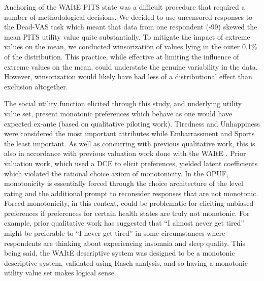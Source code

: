 \documentclass[
  number,
  preprint]{elsarticle}
\begin{document}
Anchoring of the WAItE PITS state was a difficult procedure that
required a number of methodological decisions. We decided to use
uncensored responses to the Dead-VAS task which meant that data from one
respondent (-99) skewed the mean PITS utility value quite substantially.
To mitigate the impact of extreme values on the mean, we conducted
winsorization of values lying in the outer 0.1\% of the distribution.
This practice, while effective at limiting the influence of extreme
values on the mean, could understate the genuine variability in the
data. However, winsorization would likely have had less of a
distributional effect than exclusion altogether.

The social utility function elicited through this study, and underlying
utility value set, present monotonic preferences which behave as one
would have expected ex-ante (based on qualitative piloting work).
Tiredness and Unhappiness were considered the most important attributes
while Embarrassment and Sports the least important. As well as
concurring with previous qualitative work, this is also in accordance
with previous valuation work done with the WAItE
\citep{Robinson2024AUKValue}. Prior valuation work, which used a DCE to
elicit preferences, yielded latent coefficients which violated the
rational choice axiom of monotonicity. In the OPUF, monotonicity is
essentially forced through the choice architecture of the level rating
and the additional prompt to reconsider responses that are not
monotonic. Forced monotonicity, in this context, could be problematic
for eliciting unbiased preferences if preferences for certain health
states are truly not monotonic. For example, prior qualitative work has
suggested that ``I almost never get tired'' might be preferable to ``I
never get tired'' in some circumstances where respondents are thinking
about experiencing insomnia and sleep quality. This being said, the
WAItE descriptive system was designed to be a monotonic descriptive
system, validated using Rasch analysis, and so having a monotonic
utility value set makes logical sense.
\end{document}
